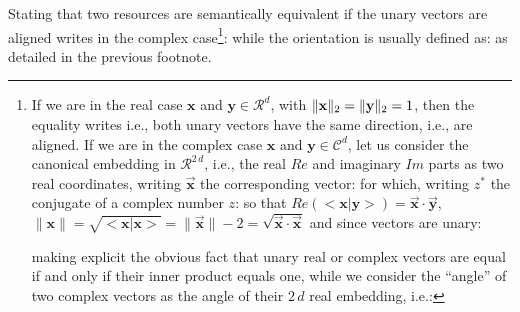 Stating that two resources are semantically equivalent if the unary vectors are aligned writes in the complex case\footnote{If we are in the real case $\mathbf{x}$ and $\mathbf{y} \in {\mathcal R}^d$, with $\|{\bf x}\|_2 = \|{\bf y}\|_2 = 1$, then the equality writes
i.e., both unary vectors have the same direction, i.e., are aligned.
If we are in the complex case $\mathbf{x}$ and $\mathbf{y} \in {\mathcal C}^d$, let us consider the canonical embedding in ${\mathcal R}^{2\,d}$, i.e., the real $Re$ and imaginary $Im$ parts as two real coordinates, writing $\overrightarrow{\mathbf{x}}$ the corresponding vector:
for which, writing $z^*$ the conjugate of a complex number $z$:
so that $Re(<\mathbf{x} | \mathbf{y}>) = \overrightarrow{\mathbf{x}} \cdot \overrightarrow{\mathbf{y}}$, $\|\mathbf{x}\| = \sqrt{<\mathbf{x}|\mathbf{x}>} = \|\overrightarrow{\mathbf{x}}\|-2 = \sqrt{\overrightarrow{\mathbf{x}} \cdot \overrightarrow{\mathbf{x}}}$ and since vectors are unary: 


making explicit the obvious fact that unary real or complex vectors are equal if and only if their inner product equals one, while we consider the ``angle'' of two complex vectors as the angle of their $2\,d$ real embedding, i.e.:
}: 
 while the orientation is usually defined as:
as detailed in the previous footnote.


